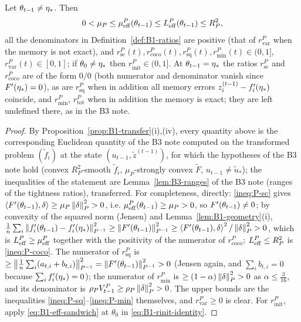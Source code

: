 \begin{lemma}\label{lem:B1-ranges}
Let $\theta_{t-1}\neq\eta_\ast$. Then
\begin{equation}\label{eq:B1-eff-sandwich}
0<\mu_P\le\mu_{\mathrm{eff}}^P(\theta_{t-1})\le L_{\mathrm{eff}}^P(\theta_{t-1})\le R_P^2 ,
\end{equation}
all the denominators in Definition~\ref{def:B1-ratios} are positive (that of $r^P_{\mathrm{var}}$ when the
memory is not exact), and
$r^P_{\mathrm{sc}}(t),r^P_{\mathrm{coco}}(t),r^P_{\mathrm{sq}}(t),r^P_{\mathrm{min}}(t)\in(0,1]$,
$r^P_{\mathrm{var}}(t)\in[0,1]$; if $\theta_0\neq\eta_\ast$ then $r^P_{\mathrm{init}}\in(0,1]$. At
$\theta_{t-1}=\eta_\ast$ the ratios $r^P_{\mathrm{sc}}$ and $r^P_{\mathrm{coco}}$ are of the form $0/0$ (both
numerator and denominator vanish since $F'(\eta_\ast)=0$), as are $r^P_{\mathrm{sq}}$ when in addition all
memory errors $z_i^{(t-1)}-f'_i(\eta_\ast)$ coincide, and $r^P_{\mathrm{min}}$, $r^P_{\mathrm{tot}}$ when in
addition the memory is exact; they are left undefined there, as in the B3 note.
\end{lemma}
\begin{proof}
By Proposition~\ref{prop:B1-transfer}(i),(iv), every quantity above is the corresponding Euclidean quantity
of the B3 note computed on the transformed problem $(\tilde f_i)$ at the state $(u_{t-1},\tilde z^{(t-1)})$,
for which the hypotheses of the B3 note hold (convex $R_P^2$-smooth $\tilde f_i$, $\mu_P$-strongly convex
$\tilde F$, $u_{t-1}\neq\tilde u_*$); the inequalities of the statement are Lemma~\ref{lem:B3-ranges} of the B3
note (ranges of the tightness ratios), transferred. For completeness, directly: \eqref{ineq:P-sc} gives
$\left\langle F'(\theta_{t-1}), \delta \right\rangle\ge\mu_P\left\|\delta\right\|_P^2>0$, i.e. $\mu_{\mathrm{eff}}^P(\theta_{t-1})\ge\mu_P>0$, so
$F'(\theta_{t-1})\neq0$; by convexity of the squared norm (Jensen) and Lemma~\ref{lem:B1-geometry}(i),
$\frac1n\sum_i\left\|f'_i(\theta_{t-1})-f'_i(\eta_\ast)\right\|_{P^{-1}}^2\ge\left\|F'(\theta_{t-1})\right\|_{P^{-1}}^2
\ge\left\langle F'(\theta_{t-1}), \delta \right\rangle^2/\left\|\delta\right\|_P^2>0$, which is $L_{\mathrm{eff}}^P\ge\mu_{\mathrm{eff}}^P$ together with the
positivity of the numerator of $r^P_{\mathrm{coco}}$; $L_{\mathrm{eff}}^P\le R_P^2$ is \eqref{ineq:P-coco}. The
numerator of $r^P_{\mathrm{sq}}$ is $\ge\left\|\frac1n\sum_i(a_{t,i}+b_{t,i})\right\|_{P^{-1}}^2
=\left\|F'(\theta_{t-1})\right\|_{P^{-1}}^2>0$ (Jensen again, and $\sum_ib_{t,i}=0$ because
$\sum_if'_i(\eta_\ast)=0$); the numerator of $r^P_{\mathrm{min}}$ is $\ge(1-\alpha)\left\|\delta\right\|_P^2>0$ as
$\alpha\le\frac3{16}$, and its denominator is $\rho_PV_{t-1}^P\ge\rho_P\left\|\delta\right\|_P^2>0$. The upper
bounds are the inequalities \eqref{ineq:P-sq}--\eqref{ineq:P-min} themselves, and $r^P_{\mathrm{var}}\ge0$
is clear. For $r^P_{\mathrm{init}}$, apply \eqref{eq:B1-eff-sandwich} at $\theta_0$ in
\eqref{eq:B1-rinit-identity}.
\end{proof}


